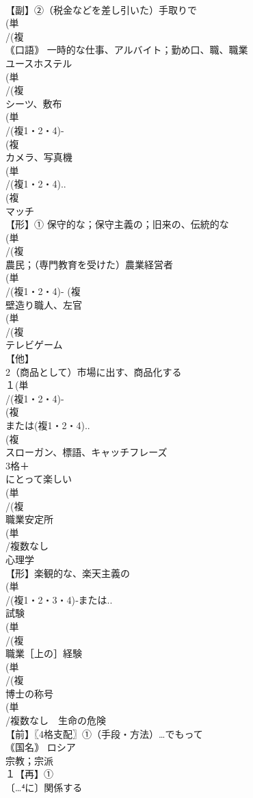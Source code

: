 \documentclass[8pt]{extreport}
\begin{document}
\begin{CJK}{UTF8}{min}
\\	【副】②（税金などを差し引いた）手取りで
\\	(単
\\	/(複
\\	｟口語｠ 一時的な仕事、アルバイト；勤め口、職、職業 
\\	ユースホステル
\\	(単
\\	/(複
\\	シーツ、敷布
\\	(単
\\	/(複1・2・4)-
\\	(複
\\	カメラ、写真機 
\\	(単
\\	/(複1・2・4)..
\\	(複
\\	マッチ 
\\	【形】① 保守的な；保守主義の；旧来の、伝統的な 
\\	(単
\\	/(複
\\	農民；（専門教育を受けた）農業経営者
\\	(単
\\	/(複1・2・4)- (複
\\	壁造り職人、左官 
\\	(単
\\	/(複
\\	テレビゲーム
\\	【他】
\\	2（商品として）市場に出す、商品化する
\\	１(単
\\	/(複1・2・4)-
\\	(複
\\	または(複1・2・4)..
\\	(複
\\	スローガン、標語、キャッチフレーズ
\\	3格＋
\\	にとって楽しい
\\	(単
\\	/(複
\\	職業安定所 
\\	(単
\\	/複数なし 
\\	心理学 
\\	【形】楽観的な、楽天主義の 
\\	(単
\\	/(複1・2・3・4)‐または..
\\	試験 
\\	(単
\\	/(複
\\	職業［上の］経験
\\	(単
\\	/(複
\\	博士の称号
\\	(単
\\	/複数なし　生命の危険
\\	【前】〖4格支配〗①（手段・方法）…でもって 
\\	｟国名｠ ロシア
\\	宗教；宗派
\\	１【再】①
\\	〔…⁴に〕関係する
\end{CJK}
\end{document}

